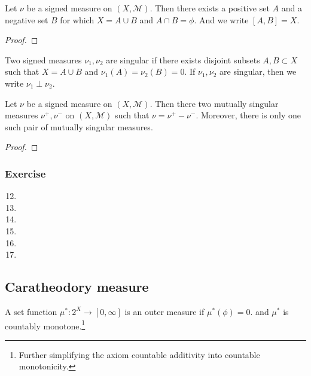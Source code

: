 \begin{theorem}
	Let $\nu$ be a signed measure on $(X,\mathcal{M})$.
	Then there exists a positive set $A$ and a negative set $B$ for which $ X = A \cup B$ and $A \cap B = \phi$.
	And we write $[A,B] = X$.
\end{theorem}
\begin{proof}
\end{proof}

\begin{definition}
	Two signed measures $\nu_1,\nu_2$ are singular if there exists disjoint subsets $A,B \subset X$ such that $X = A \cup B$ and $\nu_1(A) = \nu_2(B) = 0$.
	If $\nu_1,\nu_2$ are singular, then we write $\nu_1 \perp \nu_2$.
\end{definition}

\begin{theorem}
	Let $\nu$ be a signed measure on $(X,\mathcal{M})$.
	Then there two mutually singular measures $\nu^+,\nu^-$ on $(X,\mathcal{M})$ such that $\nu = \nu^+ - \nu^-$.
	Moreover, there is only one such pair of mutually singular measures.
\end{theorem}
\begin{proof}
\end{proof}

\subsubsection{Exercise}
\begin{enumerate}
	\setcounter{enumi}{11}
	\item
	\item
	\item
	\item
	\item
	\item
\end{enumerate}

\subsection{Caratheodory measure}
\begin{definition}
	A set function $\mu^\ast : 2^X \to [0,\infty]$ is an outer measure if $\mu^\ast(\phi) = 0$. and $\mu^\ast$ is countably monotone.\dag\footnote{Further simplifying the axiom countable additivity into countable monotonicity.}
\end{definition}

